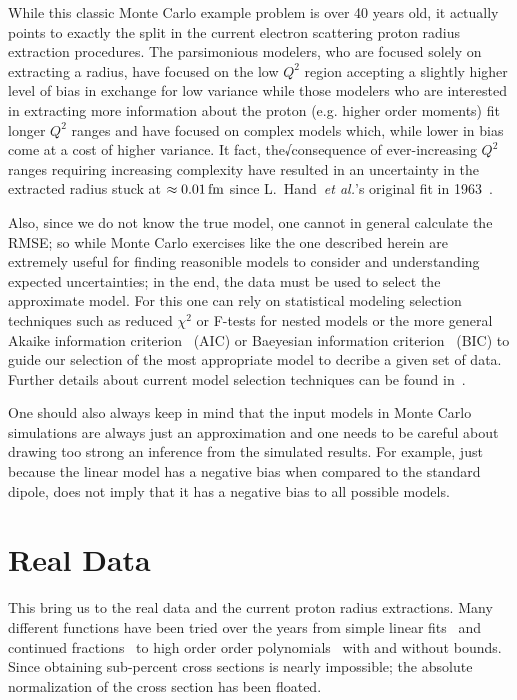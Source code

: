 \documentclass[10pt,aps,prc,twocolumn]{revtex4-1}
\begin{document}
While this classic Monte Carlo example problem is over 40 years old, it actually points to exactly the split in 
the current electron scattering proton radius extraction procedures.     The parsimonious modelers, who are 
focused solely on extracting a radius, have focused on the low $Q^2$ region accepting a slightly higher 
level of bias in exchange for low variance while those modelers who are interested in extracting more information 
about the proton (e.g. higher order moments) fit longer $Q^2$ ranges and have
focused on complex models which, while lower in bias come at a cost of higher variance.  
It fact, the√consequence of ever-increasing $Q^2$ ranges requiring increasing complexity have resulted in
an uncertainty in the extracted radius 
stuck at $\approx \unit[0.01]{fm}$ since L.~Hand~\textit{et al.}'s original fit in 1963~\cite{Hand:1963zz}.

Also, since we do not know the true model, one cannot in general calculate the RMSE; so while Monte Carlo exercises 
like the one described herein are extremely useful for finding reasonible models to consider and understanding
expected uncertainties; in the end, the data must be used to select the approximate model. 
For this one can rely on statistical modeling selection techniques such as reduced $\chi^2$ or F-tests for
nested models or the more general Akaike information criterion~\cite{Akaike:1974} (AIC) or Baeyesian information criterion~\cite{Schwarz:1978} 
(BIC) to guide our selection of the most appropriate model to decribe a given set of data.
Further details about current model selection techniques can be found in~\cite{Ernst:2012}.

One should also always keep in mind that the input models in Monte Carlo simulations are always just an approximation
and one needs to be careful about drawing too strong an inference from the simulated results. 
For example, just because the linear model has a negative bias when compared to the standard dipole, 
does not imply that it has a negative bias to all possible models.

\section{Real Data}

This bring us to the real data and the current proton radius extractions.   Many different functions have
been tried over the years from simple linear fits~\cite{Hand:1963zz,Murphy:1974zz} and continued fractions~\cite{Sick:2003gm} 
to high order order polynomials~\cite{Bernauer:2013tpr,Lee:2015jqa} with and without bounds.   Since obtaining sub-percent
cross sections is nearly impossible; the absolute normalization of the cross section has been floated.  
\end{document}
